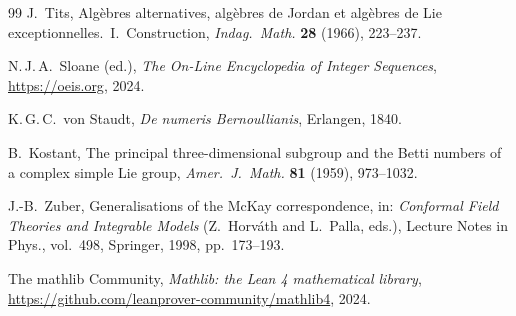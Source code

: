 \documentclass[11pt]{amsart}
\theoremstyle{plain}
\theoremstyle{definition}
\theoremstyle{remark}
\begin{document}
\begin{thebibliography}{99}
J.~Tits,
Alg\`ebres alternatives, alg\`ebres de Jordan et alg\`ebres de Lie
exceptionnelles.\ I.\ Construction,
\emph{Indag.\ Math.} \textbf{28} (1966), 223--237.

N.\,J.\,A.~Sloane (ed.),
\emph{The On-Line Encyclopedia of Integer Sequences},
\url{https://oeis.org}, 2024.

K.\,G.\,C.~von Staudt,
\emph{De numeris Bernoullianis},
Erlangen, 1840.

B.~Kostant,
The principal three-dimensional subgroup and the Betti numbers of a
complex simple Lie group,
\emph{Amer.\ J.\ Math.} \textbf{81} (1959), 973--1032.

J.-B.~Zuber,
Generalisations of the McKay correspondence,
in: \emph{Conformal Field Theories and Integrable Models} (Z.~Horv\'ath
and L.~Palla, eds.), Lecture Notes in Phys., vol.~498, Springer, 1998,
pp.~173--193.

The mathlib Community,
\emph{Mathlib: the Lean 4 mathematical library},
\url{https://github.com/leanprover-community/mathlib4}, 2024.

\end{thebibliography}
\end{document}
